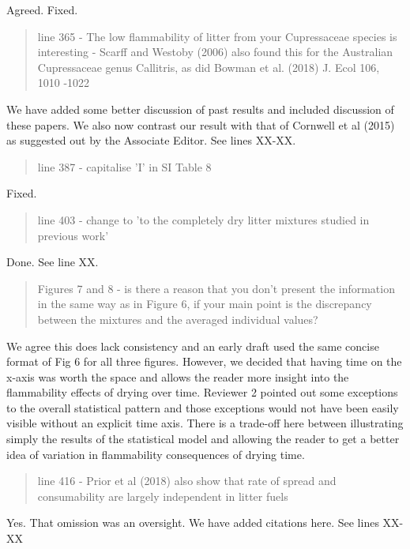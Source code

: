 \documentclass[letterpaper, 12pt]{letter}
\begin{document}
\begin{letter}{}
Agreed. Fixed. 

\begin{quote}
  line 365 - The low flammability of litter from your Cupressaceae species is
  interesting - Scarff and Westoby (2006) also found this for the Australian
  Cupressaceae genus Callitris, as did Bowman et al. (2018) J. Ecol 106, 1010
  -1022
\end{quote}

We have added some better discussion of past results and included discussion of
these papers. We also now contrast our result with that of Cornwell et al
(2015) as suggested out by the Associate Editor. See lines XX-XX.

\begin{quote}
line 387 - capitalise 'I' in SI Table  8
\end{quote}

Fixed.

\begin{quote}
line 403 - change to 'to the completely dry litter mixtures studied in previous work'
\end{quote}

Done. See line XX.

\begin{quote}
  Figures 7 and 8 - is there a reason that you don't present the information in
  the same way as in Figure 6, if your main point is the discrepancy between
  the mixtures and the averaged individual values?
\end{quote}

We agree this does lack consistency and an early draft used the same concise
format of Fig 6 for all three figures. However, we decided that having time on
the x-axis was worth the space and allows the reader more insight into the
flammability effects of drying over time. Reviewer 2 pointed out some
exceptions to the overall statistical pattern and those exceptions would not
have been easily visible without an explicit time axis. There is a trade-off
here between illustrating simply the results of the statistical model and
allowing the reader to get a better idea of variation in flammability
consequences of drying time.

\begin{quote}
  line 416 - Prior et al (2018) also show that rate of spread and consumability
  are largely independent in litter fuels
\end{quote}

Yes. That omission was an oversight. We have added citations here. See lines
XX-XX


\end{letter}
\end{document}
